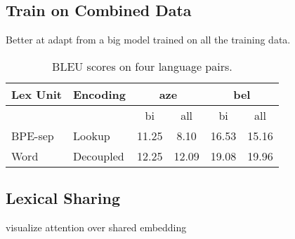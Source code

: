 

\subsection{Train on Combined Data}
Better at adapt from a big model trained on all the training data.
\begin{table}[h]
    \centering
    \begin{tabular}{ll|cc|cc}
   Lex Unit & Encoding & \multicolumn{2}{c|}{aze} & \multicolumn{2}{c}{bel}  \\
    \midrule
    &  & bi & all & bi & all \\
    \midrule
    BPE-sep & Lookup & 11.25 & 8.10 & 16.53 & 15.16 \\
    Word & Decoupled & 12.25 & 12.09 & 19.08 & 19.96 \\
    \end{tabular}
    \caption{BLEU scores on four language pairs.}
    \label{tab:lex_bound}
\end{table}


\subsection{Lexical Sharing}
visualize attention over shared embedding